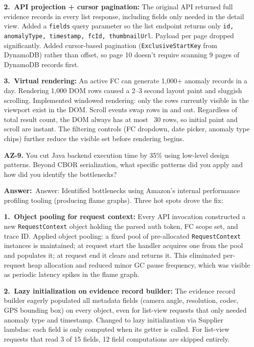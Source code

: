 \documentclass[letterpaper,10pt]{article}
\newlength{\boxwidth}
\newcommand{\answerlabel}{\noindent\textbf{\textcolor{answerblue}{Answer:}}~}
\begin{document}
\textbf{2.~API projection + cursor pagination:} The original API returned full evidence records in every list response, including fields only needed in the detail view. Added a \texttt{fields} query parameter so the list endpoint returns only \texttt{id, anomalyType, timestamp, fcId, thumbnailUrl}. Payload per page dropped significantly. Added cursor-based pagination (\texttt{ExclusiveStartKey} from DynamoDB) rather than offset, so page 10 doesn't require scanning 9 pages of DynamoDB records first.

\textbf{3.~Virtual rendering:} An active FC can generate 1,000+ anomaly records in a day. Rendering 1,000 DOM rows caused a 2--3 second layout paint and sluggish scrolling. Implemented windowed rendering: only the rows currently visible in the viewport exist in the DOM. Scroll events swap rows in and out. Regardless of total result count, the DOM always has at most ~30 rows, so initial paint and scroll are instant. The filtering controls (FC dropdown, date picker, anomaly type chips) further reduce the visible set before rendering begins.

\vspace{6pt}

\colorbox{qbg}{\begin{minipage}{\boxwidth}
\textbf{AZ-9.} You cut Java backend execution time by 35\% using low-level design patterns. Beyond CBOR serialization, what specific patterns did you apply and how did you identify the bottlenecks?
\end{minipage}}

\vspace{2pt}
\answerlabel{Answer:} Identified bottlenecks using Amazon's internal performance profiling tooling (producing flame graphs). Three hot spots drove the fix:

\textbf{1.~Object pooling for request context:} Every API invocation constructed a new \texttt{RequestContext} object holding the parsed auth token, FC scope set, and trace ID. Applied object pooling: a fixed pool of pre-allocated \texttt{RequestContext} instances is maintained; at request start the handler acquires one from the pool and populates it; at request end it clears and returns it. This eliminated per-request heap allocation and reduced minor GC pause frequency, which was visible as periodic latency spikes in the flame graph.

\textbf{2.~Lazy initialization on evidence record builder:} The evidence record builder eagerly populated all metadata fields (camera angle, resolution, codec, GPS bounding box) on every object, even for list-view requests that only needed anomaly type and timestamp. Changed to lazy initialization via Supplier lambdas: each field is only computed when its getter is called. For list-view requests that read 3 of 15 fields, 12 field computations are skipped entirely.
\end{document}
